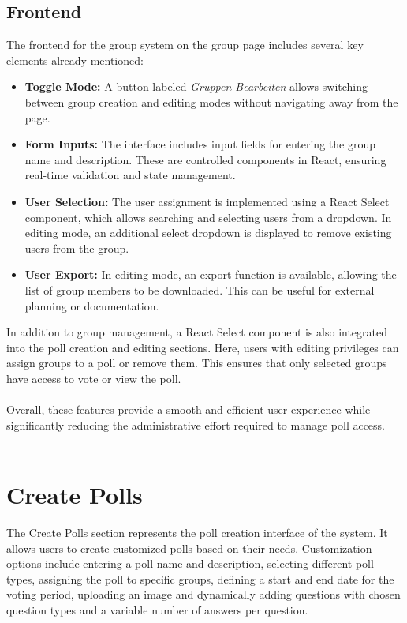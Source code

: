 \documentclass[a4paper,12pt]{report}
\begin{document}
\subsection{Frontend}
The frontend for the group system on the group page includes several key elements already mentioned:
\begin{itemize}
	\item \textbf{Toggle Mode:} A button labeled \textit{Gruppen Bearbeiten} allows switching between group creation and editing modes without navigating away from the page.
	\item \textbf{Form Inputs:} The interface includes input fields for entering the group name and description. These are controlled components in React, ensuring real-time validation and state management.
	\item \textbf{User Selection:} The user assignment is implemented using a React Select component, which allows searching and selecting users from a dropdown. In editing mode, an additional select dropdown is displayed to remove existing users from the group.
	\item \textbf{User Export:} In editing mode, an export function is available, allowing the list of group members to be downloaded. This can be useful for external planning or documentation.
\end{itemize}
In addition to group management, a React Select component is also integrated into the poll creation and editing sections. Here, users with editing privileges can assign groups to a poll or remove them. This ensures that only selected groups have access to vote or view the poll. \\ \\
Overall, these features provide a smooth and efficient user experience while significantly reducing the administrative effort required to manage poll access. \\ \\

\section{Create Polls}
The Create Polls section represents the poll creation interface of the system. It allows users to create customized polls based on their needs. Customization options include entering a poll name and description, selecting different poll types, assigning the poll to specific groups, defining a start and end date for the voting period, uploading an image and dynamically adding questions with chosen question types and a variable number of answers per question. \\
\end{document}
